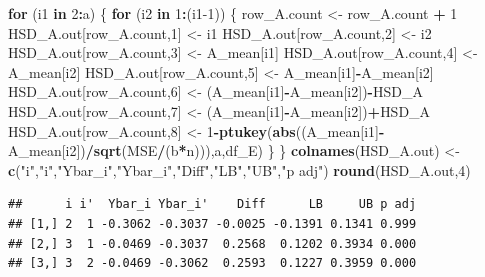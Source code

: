 \documentclass[
]{book}
\newenvironment{Shaded}{\begin{snugshade}}{\end{snugshade}}
\newcommand{\ControlFlowTok}[1]{\textcolor[rgb]{0.13,0.29,0.53}{\textbf{#1}}}
\newcommand{\DecValTok}[1]{\textcolor[rgb]{0.00,0.00,0.81}{#1}}
\newcommand{\FunctionTok}[1]{\textcolor[rgb]{0.13,0.29,0.53}{\textbf{#1}}}
\newcommand{\NormalTok}[1]{#1}
\newcommand{\OtherTok}[1]{\textcolor[rgb]{0.56,0.35,0.01}{#1}}
\newcommand{\SpecialCharTok}[1]{\textcolor[rgb]{0.81,0.36,0.00}{\textbf{#1}}}
\newcommand{\StringTok}[1]{\textcolor[rgb]{0.31,0.60,0.02}{#1}}
\begin{document}
\begin{Shaded}
\begin{Highlighting}[]
\ControlFlowTok{for}\NormalTok{ (i1 }\ControlFlowTok{in} \DecValTok{2}\SpecialCharTok{:}\NormalTok{a) \{}
  \ControlFlowTok{for}\NormalTok{ (i2 }\ControlFlowTok{in} \DecValTok{1}\SpecialCharTok{:}\NormalTok{(i1}\DecValTok{{-}1}\NormalTok{)) \{}
\NormalTok{    row\_A.count }\OtherTok{\textless{}{-}}\NormalTok{ row\_A.count }\SpecialCharTok{+} \DecValTok{1}
\NormalTok{    HSD\_A.out[row\_A.count,}\DecValTok{1}\NormalTok{] }\OtherTok{\textless{}{-}}\NormalTok{ i1}
\NormalTok{    HSD\_A.out[row\_A.count,}\DecValTok{2}\NormalTok{] }\OtherTok{\textless{}{-}}\NormalTok{ i2}
\NormalTok{    HSD\_A.out[row\_A.count,}\DecValTok{3}\NormalTok{] }\OtherTok{\textless{}{-}}\NormalTok{ A\_mean[i1]}
\NormalTok{    HSD\_A.out[row\_A.count,}\DecValTok{4}\NormalTok{] }\OtherTok{\textless{}{-}}\NormalTok{ A\_mean[i2]}
\NormalTok{    HSD\_A.out[row\_A.count,}\DecValTok{5}\NormalTok{] }\OtherTok{\textless{}{-}}\NormalTok{ A\_mean[i1]}\SpecialCharTok{{-}}\NormalTok{A\_mean[i2]}
\NormalTok{    HSD\_A.out[row\_A.count,}\DecValTok{6}\NormalTok{] }\OtherTok{\textless{}{-}}\NormalTok{ (A\_mean[i1]}\SpecialCharTok{{-}}\NormalTok{A\_mean[i2])}\SpecialCharTok{{-}}\NormalTok{HSD\_A}
\NormalTok{    HSD\_A.out[row\_A.count,}\DecValTok{7}\NormalTok{] }\OtherTok{\textless{}{-}}\NormalTok{ (A\_mean[i1]}\SpecialCharTok{{-}}\NormalTok{A\_mean[i2])}\SpecialCharTok{+}\NormalTok{HSD\_A}
\NormalTok{    HSD\_A.out[row\_A.count,}\DecValTok{8}\NormalTok{] }\OtherTok{\textless{}{-}} 
      \DecValTok{1}\SpecialCharTok{{-}}\FunctionTok{ptukey}\NormalTok{(}\FunctionTok{abs}\NormalTok{((A\_mean[i1]}\SpecialCharTok{{-}}\NormalTok{A\_mean[i2])}\SpecialCharTok{/}\FunctionTok{sqrt}\NormalTok{(MSE}\SpecialCharTok{/}\NormalTok{(b}\SpecialCharTok{*}\NormalTok{n))),a,df\_E)}
\NormalTok{  \}}
\NormalTok{\}}
\FunctionTok{colnames}\NormalTok{(HSD\_A.out) }\OtherTok{\textless{}{-}} \FunctionTok{c}\NormalTok{(}\StringTok{"i"}\NormalTok{,}\StringTok{"i\textquotesingle{}"}\NormalTok{,}\StringTok{"Ybar\_i"}\NormalTok{,}\StringTok{"Ybar\_i\textquotesingle{}"}\NormalTok{,}\StringTok{"Diff"}\NormalTok{,}\StringTok{"LB"}\NormalTok{,}\StringTok{"UB"}\NormalTok{,}\StringTok{"p adj"}\NormalTok{)}
\FunctionTok{round}\NormalTok{(HSD\_A.out,}\DecValTok{4}\NormalTok{)}
\end{Highlighting}
\end{Shaded}

\begin{verbatim}
##      i i'  Ybar_i Ybar_i'    Diff      LB     UB p adj
## [1,] 2  1 -0.3062 -0.3037 -0.0025 -0.1391 0.1341 0.999
## [2,] 3  1 -0.0469 -0.3037  0.2568  0.1202 0.3934 0.000
## [3,] 3  2 -0.0469 -0.3062  0.2593  0.1227 0.3959 0.000
\end{verbatim}
\end{document}
